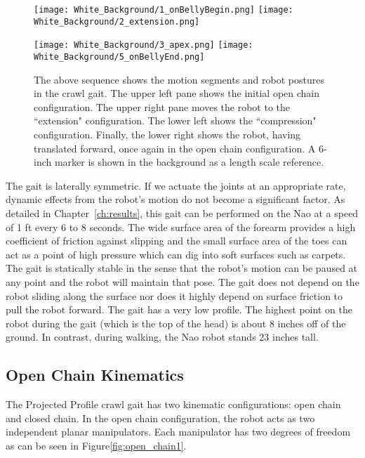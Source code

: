 \begin{figure}%
	\centerline{\texttt{[image: White\_Background/1\_onBellyBegin.png]}
				\texttt{[image: White\_Background/2\_extension.png]}
				}

	\vspace*{0.05in}

	\centerline{\texttt{[image: White\_Background/3\_apex.png]}
				\texttt{[image: White\_Background/5\_onBellyEnd.png]}
				}
	\caption{The above sequence shows the motion segments and robot postures in the crawl gait. 
				The upper left pane shows the initial open chain configuration. The upper right
				pane moves the robot to the ``extension" configuration. The lower left
				shows the ``compression" configuration. Finally, the lower right shows the 
				robot, having translated forward, once again in the open chain configuration.
				A 6-inch marker is shown in the background as a length scale reference.}
	\label{fig:nao_phases1}
\end{figure}

The gait is laterally symmetric. 
If we actuate the joints at an appropriate rate, dynamic effects from the robot's motion do not become a significant factor.
As detailed in Chapter~\ref{ch:results}, this gait can be performed on the Nao at a speed of 1 ft every 6 to 8 seconds. 
The wide surface area of the forearm provides a high coefficient of friction against slipping and the small surface area of
the toes can act as a point of high pressure which can dig into soft surfaces such as carpets.
The gait is statically stable in the sense that the robot's motion can be paused at any point and the robot will maintain that pose.
The gait does not depend on the robot
sliding along the surface nor does it highly depend on surface friction to pull the robot forward.
The gait has a very low profile. The highest point on the robot during the gait (which is the top of the head)
is about 8 inches off of the ground. In contrast, during walking, the Nao robot stands 23 inches tall.

\subsection{Open Chain Kinematics}
The Projected Profile crawl gait has two kinematic configurations: open chain and closed chain. In the open chain
configuration, the robot acts as two independent planar manipulators. 
Each manipulator has two degrees of freedom as can be seen in Figure\ref{fig:open_chain1}.

